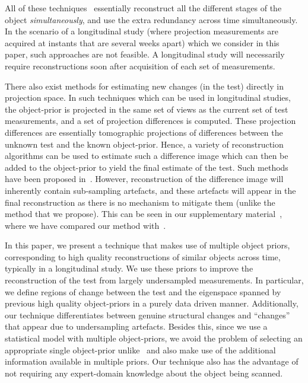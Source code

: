 \documentclass[journal]{IEEEtran}
\begin{document}
All of these
techniques~\cite{daniil2015,koen2020,Van2015,HaoGao,Van2014}
essentially reconstruct all the different stages of the object
\textit{simultaneously}, and use the extra redundancy across time
simultaneously. In the scenario of a longitudinal study (where
projection measurements are acquired at instants that are several
weeks apart) which we consider in this paper, such approaches are not
feasible. A longitudinal study will necessarily require
reconstructions soon after acquisition of each set of measurements.

There also exist methods for estimating new changes (in the test)
directly in projection space. In such techniques which can be used in
longitudinal studies, the object-prior is projected in the same set of
views as the current set of test measurements, and a set of projection
differences is computed. These projection differences are essentially
tomographic projections of differences between the unknown test and
the known object-prior. Hence, a variety of reconstruction algorithms
can be used to estimate such a difference image which can then be
added to the object-prior to yield the final estimate of the
test. Such methods have been proposed
in~\cite{Pourmorteza2015,Lee2012}. However, reconstruction of the
difference image will inherently contain sub-sampling artefacts, and
these artefacts will appear in the final reconstruction as there is no
mechanism to mitigate them (unlike the method that we propose). This
can be seen in our supplementary material~\cite{supp_paper},
where we have compared our method with~\cite{Lee2012}.

In this paper, we present a technique that makes use of multiple
object priors, corresponding to high quality reconstructions of
similar objects across time, typically in a longitudinal study.  We
use these priors to improve the reconstruction of the test from
largely undersampled measurements. In particular, we define regions of
change between the test and the eigenspace spanned by previous high
quality object-priors in a purely data driven manner. Additionally,
our technique differentiates between genuine structural changes and
``changes'' that appear due to undersampling artefacts.  Besides this,
since we use a statistical model with multiple object-priors, we avoid
the problem of selecting an appropriate single object-prior
unlike~\cite{PICCS,Pourmorteza2015,Lee2012,pirple,Marjolein2016} and
also make use of the additional information available in multiple
priors. Our technique also has the advantage of not requiring any
expert-domain knowledge about the object being scanned.
 
\end{document}
